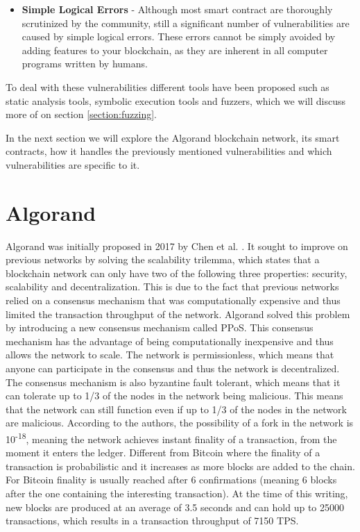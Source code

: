 \begin{itemize}
    \item \textbf{Simple Logical Errors} - Although most smart contract are thoroughly scrutinized by the community, still a significant number of vulnerabilities are caused by simple logical errors. These errors cannot be simply avoided by adding features to your blockchain, as they are inherent in all computer programs written by humans.
\end{itemize}

To deal with these vulnerabilities different tools have been proposed such as static analysis tools, symbolic execution tools and fuzzers, which we will discuss more of on section \ref{section:fuzzing}.

In the next section we will explore the Algorand blockchain network, its smart contracts, how it handles the previously mentioned vulnerabilities and which vulnerabilities are specific to it.

\section{Algorand} \label{section:algorand}
Algorand was initially proposed in 2017 by Chen et al. \cite{chen_algorand_2017}. It sought to improve on previous networks by solving the scalability trilemma, which states that a blockchain network can only have two of the following three properties: security, scalability and decentralization. This is due to the fact that previous networks relied on a consensus mechanism that was computationally expensive and thus limited the transaction throughput of the network. Algorand solved this problem by introducing a new consensus mechanism called \ac{PPoS}. This consensus mechanism has the advantage of being computationally inexpensive and thus allows the network to scale. The network is permissionless, which means that anyone can participate in the consensus and thus the network is decentralized. The consensus mechanism is also byzantine fault tolerant, which means that it can tolerate up to 1/3 of the nodes in the network being malicious. This means that the network can still function even if up to 1/3 of the nodes in the network are malicious. According to the authors, the possibility of a fork in the network is 10\textsuperscript{-18}, meaning the network achieves instant finality of a transaction, from the moment it enters the ledger. Different from Bitcoin where the finality of a transaction is probabilistic and it increases as more blocks are added to the chain. For Bitcoin finality is usually reached after 6 confirmations (meaning 6 blocks after the one containing the interesting transaction). At the time of this writing, new blocks are produced at an average of 3.5 seconds and can hold up to 25000 transactions, which results in a transaction throughput of 7150 \ac{TPS}.

